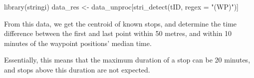 \documentclass[]{scrreprt}
\newenvironment{Shaded}{}{}
\newcommand{\DataTypeTok}[1]{#1}
\newcommand{\KeywordTok}[1]{\textcolor[rgb]{0.00,0.00,1.00}{#1}}
\newcommand{\NormalTok}[1]{#1}
\newcommand{\StringTok}[1]{\textcolor[rgb]{0.00,0.50,0.50}{#1}}
\begin{document}
\begin{Shaded}
\begin{Highlighting}[]
\KeywordTok{library}\NormalTok{(stringi)}
\NormalTok{data_res <-}\StringTok{ }\NormalTok{data_unproc[}\KeywordTok{stri_detect}\NormalTok{(tID, }\DataTypeTok{regex =} \StringTok{"(WP)"}\NormalTok{)]}
\end{Highlighting}
\end{Shaded}

From this data, we get the centroid of known stops, and determine the time difference between the first and last point within 50 metres, and within 10 minutes of the waypoint positions' median time.

Essentially, this means that the maximum duration of a stop can be 20 minutes, and stops above this duration are not expected.
\end{document}
